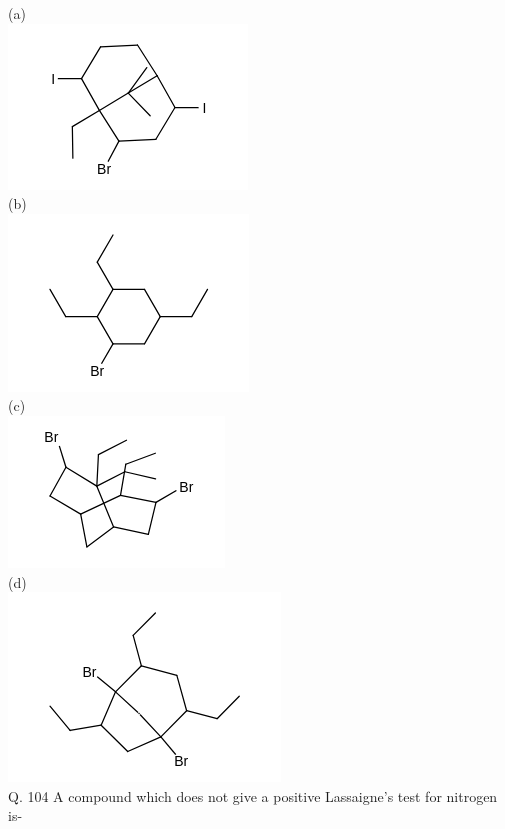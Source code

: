 \documentclass[10pt]{article}
\begin{document}
(a)\\
\includegraphics{smile-d5605205beedae19e13b564bd83a65fcd975b11f}\\
(b)\\
\includegraphics{smile-3ce0a85ce72f9dea33d3a637e2fd9550b5fd86d4}\\
(c)\\
\includegraphics{smile-61524c0cdf719f390057a67d7e1e4a9297be4271}\\
(d)\\
\includegraphics{smile-2b50d1a10ff961e510db0a61f0e2fbd6d4501f4f}\\
Q. 104 A compound which does not give a positive Lassaigne's test for nitrogen is-\\
\end{document}
